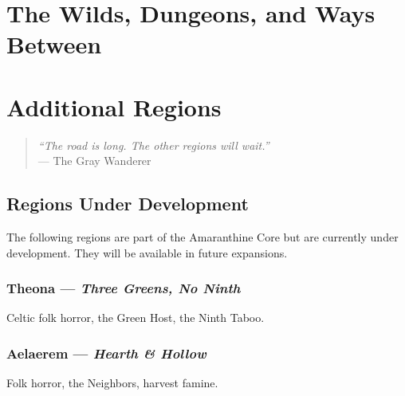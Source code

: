 \documentclass[12pt,oneside]{book}
\begin{document}
\newpage

\newpage

\newpage


\part{The Wilds, Dungeons, and Ways Between}

\newpage

\newpage

\newpage


\part*{Additional Regions}

\begin{quote}
  \small
  \textit{``The road is long. The other regions will wait.''}
  \\ --- The Gray Wanderer
\end{quote}

\chapter*{Regions Under Development}

The following regions are part of the Amaranthine Core but are currently under development. They will be available in future expansions.

\section*{Theona --- \textit{Three Greens, No Ninth}}
Celtic folk horror, the Green Host, the Ninth Taboo.

\section*{Aelaerem --- \textit{Hearth \& Hollow}}
Folk horror, the Neighbors, harvest famine.
\end{document}
